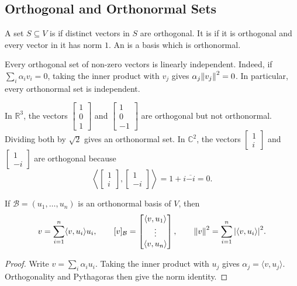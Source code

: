 \subsection{Orthogonal and Orthonormal Sets}

\begin{Definition}
A set $S\subseteq V$ is  if distinct vectors in $S$ are orthogonal. It is  if it is orthogonal and every vector in it has norm $1$. An  is a basis which is orthonormal.
\end{Definition}

Every orthogonal set of non-zero vectors is linearly independent. Indeed, if $\sum_i\alpha_iv_i=0$, taking the inner product with $v_j$ gives $\alpha_j\norm{v_j}^2=0$. In particular, every orthonormal set is independent.

\begin{Example}
In $\mathbb R^3$, the vectors $\begin{bmatrix}1\\0\\1\end{bmatrix}$ and $\begin{bmatrix}1\\0\\-1\end{bmatrix}$ are orthogonal but not orthonormal. Dividing both by $\sqrt2$ gives an orthonormal set. In $\mathbb C^2$, the vectors $\begin{bmatrix}1\\i\end{bmatrix}$ and $\begin{bmatrix}1\\-i\end{bmatrix}$ are orthogonal because
\begin{equation*}
\left\langle\begin{bmatrix}1\\i\end{bmatrix},\begin{bmatrix}1\\-i\end{bmatrix}\right\rangle=1+i\overline{-i}=0.
\end{equation*}
\end{Example}

\begin{Theorem}\label{thm:ONCoordinates}
If $\mathcal B=(u_1,\ldots,u_n)$ is an orthonormal basis of $V$, then
\begin{equation*}
v=\sum_{i=1}^n\langle v,u_i\rangle u_i,
\qquad
[v]_{\mathcal B}=\begin{bmatrix}\langle v,u_1\rangle\\\vdots\\\langle v,u_n\rangle\end{bmatrix},
\qquad
\norm{v}^2=\sum_{i=1}^n\abs{\langle v,u_i\rangle}^2.
\end{equation*}
\end{Theorem}
\begin{proof}
Write $v=\sum_i\alpha_iu_i$. Taking the inner product with $u_j$ gives $\alpha_j=\langle v,u_j\rangle$. Orthogonality and Pythagoras then give the norm identity.
\end{proof}

